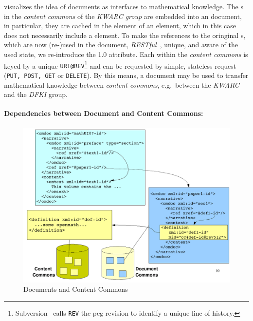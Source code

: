 \documentclass[a4paper]{article}
\begin{document}
 visualizes the idea of documents as interfaces to mathematical
knowledge. The {\infom}s in the {\emph{content commons}} of the {\emph{KWARC group}} are
embedded into an {\omdoc} document, in particular, they are cached in the
{} element of an {} element, which in this case does not
necessarily include a {} element. To make the references to the
oringinal {\infom}s, which are now (re-)used in the document,
{\emph{RESTful}}~\cite{wiki:rst}, unique, and aware of the used {\infom} state, we
re-introduce the {\omdoc}1.0 {} attribute. Each {\infom} within the
{\emph{content commons}} is keyed by a unique
{\tt{URI@REV}}\footnote{Subversion~\cite{SVN:web} calls {\tt{REV}} the peg revision to
  identify a unique line of history.} and can be requested by simple, stateless
{} request ({\tt{PUT, POST, GET}} or {\tt{DELETE}}).  By this means, a document
may be used to transfer mathematical knowledge between {\emph{content commons}}, e.g.\
between the {\emph{KWARC}} and the {\emph{DFKI}} group.

\paragraph{Dependencies between Document and Content Commons:} 
\begin{figure}
\includegraphics[width=.47\textwidth]{img/docsAndCommons.png}
\caption{Documents and Content Commons}\label{fig:docsAndCommons}
\end{figure}
\end{document}
